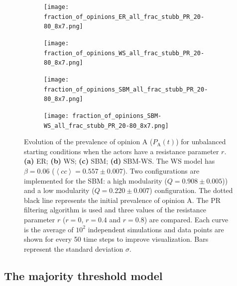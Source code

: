 \documentclass[11 pt , letterpaper , twoside , openright]{book}
\begin{document}
\begin{figure}[H]
  \begin{subfigure}[b]{0.49\textwidth}
    \caption{}
  	\texttt{[image: fraction\_of\_opinions\_ER\_all\_frac\_stubb\_PR\_20-80\_8x7.png]}
  \end{subfigure}
  \begin{subfigure}[b]{0.49\textwidth}
    \caption{}
  	\texttt{[image: fraction\_of\_opinions\_WS\_all\_frac\_stubb\_PR\_20-80\_8x7.png]}
  \end{subfigure}
  \begin{subfigure}[b]{0.49\textwidth}
    \caption{}
    \texttt{[image: fraction\_of\_opinions\_SBM\_all\_frac\_stubb\_PR\_20-80\_8x7.png]}
  \end{subfigure}
  \begin{subfigure}[b]{0.49\textwidth}
    \caption{}
    \texttt{[image: fraction\_of\_opinions\_SBM-WS\_all\_frac\_stubb\_PR\_20-80\_8x7.png]}
  \end{subfigure}
  \captionsetup{format=plain}
  \caption[Evolution of the prevalence of opinion A ($P_\text{A}(t)$) for unbalanced starting conditions when the actors have a resistance parameter $r$. The PR filtering algorithm is used and three values of the resistance parameter $r$ ($r = 0$, $r = 0.4$ and $r = 0.8$) are compared.]{Evolution of the prevalence of opinion A ($P_\text{A}(t)$) for unbalanced starting conditions when the actors have a resistance parameter $r$. \textbf{(a)} ER; \textbf{(b)} WS; \textbf{(c)} SBM; \textbf{(d)} SBM-WS. The WS model has $\beta = 0.06$ ($\left<cc\right> = 0.557 \pm 0.007$). Two configurations are implemented for the SBM: a high modularity ($Q = 0.908 \pm 0.005$)) and a low modularity ($Q = 0.220 \pm 0.007$) configuration. The dotted black line represents the initial prevalence of opinion A. The PR filtering algorithm is used and three values of the resistance parameter $r$ ($r = 0$, $r = 0.4$ and $r = 0.8$) are compared. Each curve is the average of $10^2$ independent simulations and data points are shown for every 50 time steps to improve visualization. Bars represent the standard deviation $\sigma$.}
\label{ev_op_20_80_all_frac_stubb_PR}
\end{figure}

\subsection{The majority threshold model}
\label{majThres}
\end{document}
